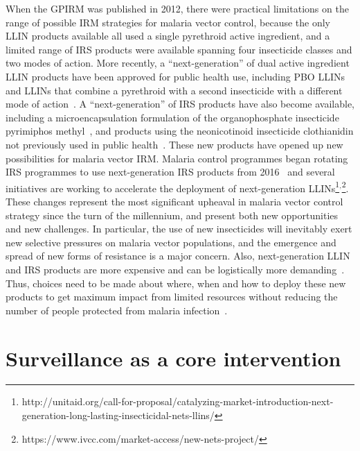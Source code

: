\begin{refsection}
When the GPIRM was published in 2012, there were practical limitations on the range of possible IRM strategies for malaria vector control, because the only LLIN products available all used a single pyrethroid active ingredient, and a limited range of IRS products were available spanning four insecticide classes and two modes of action.
%
More recently, a ``next-generation'' of dual active ingredient LLIN products have been approved for public health use, including PBO LLINs~\parencite{Gleave2018} and LLINs that combine a pyrethroid with a second insecticide with a different mode of action~\parencite{Bayili2017,Tiono2018}.
%
A ``next-generation'' of IRS products have also become available, including a microencapsulation formulation of the organophosphate insecticide pyrimiphos methyl~\parencite{Oxborough2014}, and products using the neonicotinoid insecticide clothianidin not previously used in public health~\parencite{Oxborough2019}.
%
These new products have opened up new possibilities for malaria vector IRM.
%
Malaria control programmes began rotating IRS programmes to use next-generation IRS products from 2016~\parencite{Tangena2020} and several initiatives are working to accelerate the deployment of next-generation LLINs\footnote{http://unitaid.org/call-for-proposal/catalyzing-market-introduction-next-generation-long-lasting-insecticidal-nets-llins/}$^{,}$\footnote{https://www.ivcc.com/market-access/new-nets-project/}.
%
These changes represent the most significant upheaval in malaria vector control strategy since the turn of the millennium, and present both new opportunities and new challenges.
%
In particular, the use of new insecticides will inevitably exert new selective pressures on malaria vector populations, and the emergence and spread of new forms of resistance is a major concern.
%
Also, next-generation LLIN and IRS products are more expensive and can be logistically more demanding~\parencite{TenBrink2018}.
%
Thus, choices need to be made about where, when and how to deploy these new products to get maximum impact from limited resources without reducing the number of people protected from malaria infection~\parencite{WHO2017PBOLLIN}.


\section{Surveillance as a core intervention}\label{sec:surveillance}



\end{refsection}
